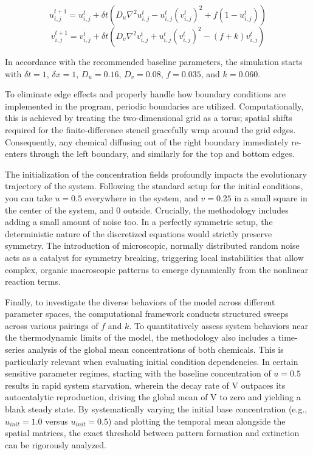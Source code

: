 \documentclass[10pt, journal]{IEEEtran}
\begin{document}
    \begin{equation}
        u^{t+1}_{i,j} = u^{t}_{i,j} + \delta t \left( D_{u} \nabla^2 u^{t}_{i,j} - u^{t}_{i,j}(v^{t}_{i,j})^2 + f(1 - u^{t}_{i,j}) \right)
    \end{equation}
    \begin{equation}
        v^{t+1}_{i,j} = v^{t}_{i,j} + \delta t \left( D_{v} \nabla^2 v^{t}_{i,j} + u^{t}_{i,j}(v^{t}_{i,j})^2 - (f+k)v^{t}_{i,j} \right)
    \end{equation}
    
    In accordance with the recommended baseline parameters, the simulation starts with $\delta t=1$, $\delta x=1$, $D_{u}=0.16$, $D_{v}=0.08$, $f=0.035$, and $k=0.060$. 
    
    To eliminate edge effects and properly handle how boundary conditions are implemented in the program, periodic boundaries are utilized. Computationally, this is achieved by treating the two-dimensional grid as a torus; spatial shifts required for the finite-difference stencil gracefully wrap around the grid edges. Consequently, any chemical diffusing out of the right boundary immediately re-enters through the left boundary, and similarly for the top and bottom edges.
    
    The initialization of the concentration fields profoundly impacts the evolutionary trajectory of the system. Following the standard setup for the initial conditions, you can take $u=0.5$ everywhere in the system, and $v=0.25$ in a small square in the center of the system, and 0 outside. Crucially, the methodology includes adding a small amount of noise too. In a perfectly symmetric setup, the deterministic nature of the discretized equations would strictly preserve symmetry. The introduction of microscopic, normally distributed random noise acts as a catalyst for symmetry breaking, triggering local instabilities that allow complex, organic macroscopic patterns to emerge dynamically from the nonlinear reaction terms.
    
    Finally, to investigate the diverse behaviors of the model across different parameter spaces, the computational framework conducts structured sweeps across various pairings of $f$ and $k$. To quantitatively assess system behaviors near the thermodynamic limits of the model, the methodology also includes a time-series analysis of the global mean concentrations of both chemicals. This is particularly relevant when evaluating initial condition dependencies. In certain sensitive parameter regimes, starting with the baseline concentration of $u=0.5$ results in rapid system starvation, wherein the decay rate of V outpaces its autocatalytic reproduction, driving the global mean of V to zero and yielding a blank steady state. By systematically varying the initial base concentration (e.g., $u_{init} = 1.0$ versus $u_{init} = 0.5$) and plotting the temporal mean alongside the spatial matrices, the exact threshold between pattern formation and extinction can be rigorously analyzed.
\end{document}
